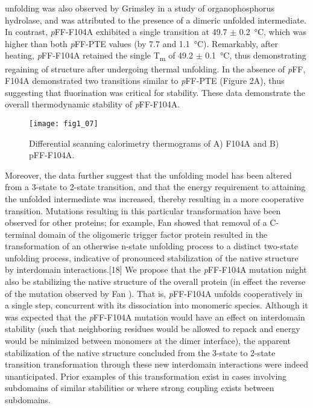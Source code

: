 \begin{refsection}
unfolding was also observed by Grimsley   in a study of
organophosphorus hydrolase, and was attributed to the presence of a dimeric
unfolded intermediate.\cite{Grimsley1997b} In contrast, \emph{p}FF-F104A
exhibited a single transition at 49.7 $\pm$ \SI{0.2}{\celsius}, which was
higher than both \emph{p}FF-PTE values (by 7.7 and \SI{1.1}{\celsius}).
Remarkably, after heating, \emph{p}FF-F104A retained the single
T\textsubscript{m} of 49.2 $\pm$ \SI{0.1}{\celsius}, thus demonstrating
regaining of structure after undergoing thermal unfolding.  In the absence of
\emph{p}FF, F104A demonstrated two transitions similar to \emph{p}FF-PTE
(Figure 2A), thus suggesting that fluorination was critical for stability.
These data demonstrate the overall thermodynamic stability of \emph{p}FF-F104A.
\begin{figure}[h!] \centering \texttt{[image: fig1\_07]}
    \caption[Differential scanning calorimetry thermograms of (A) F104A and (B)
    \emph{p}FF-F104A.]{Differential scanning calorimetry thermograms of A)
    F104A and B) pFF-F104A.} \label{fig:DSC-fig} 
\end{figure}
Moreover, the data further suggest that the unfolding model has been altered
from a 3-state to 2-state transition, and that the energy requirement to
attaining the unfolded intermediate was increased, thereby resulting in a more
cooperative transition. Mutations resulting in this particular transformation
have been observed for other proteins; for example, Fan  showed
that removal of a C-terminal domain of the oligomeric  trigger
factor protein resulted in the transformation of an otherwise n-state unfolding
process to a distinct two-state unfolding process, indicative of pronounced
stabilization of the native structure by interdomain interactions.[18] We
propose that the \emph{p}FF-F104A mutation might also be stabilizing the native
structure of the overall protein (in effect the reverse of the mutation
observed by Fan ).\cite{Fan2008} That is, \emph{p}FF-F104A unfolds
cooperatively in a single step, concurrent with its dissociation into monomeric
species. Although it was expected that the \emph{p}FF-F104A mutation would have an
effect on interdomain stability (such that neighboring residues would be
allowed to repack and energy would be minimized between monomers at the dimer
interface), the apparent stabilization of the native structure concluded from
the 3-state to 2-state transition transformation through these new interdomain
interactions were indeed unanticipated. Prior examples of this transformation
exist in cases involving subdomains of similar stabilities or where strong
coupling exists between subdomains.\cite{Tsytlonok2013}


\end{refsection}
